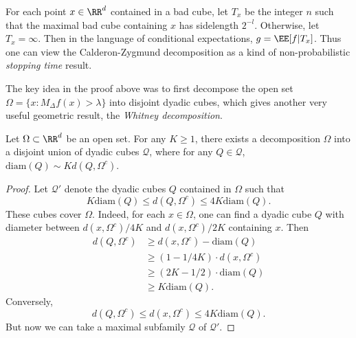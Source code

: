 \begin{remark}
    For each point $x \in \RR^d$ contained in a bad cube, let $T_x$ be the integer $n$ such that the maximal bad cube containing $x$ has sidelength $2^{-l}$. Otherwise, let $T_x = \infty$. Then in the language of conditional expectations, $g = \EE[f | T_x]$. Thus one can view the Calderon-Zygmund decomposition as a kind of non-probabilistic \emph{stopping time} result.
\end{remark}

The key idea in the proof above was to first decompose the open set $\Omega = \{ x : M_\Delta f(x) > \lambda \}$ into disjoint dyadic cubes, which gives another very useful geometric result, the \emph{Whitney decomposition}.

\begin{theorem}
    Let $\Omega \subset \RR^d$ be an open set. For any $K \geq 1$, there exists a decomposition $\Omega$ into a disjoint union of dyadic cubes $\mathcal{Q}$, where for any $Q \in \mathcal{Q}$, $\text{diam}(Q) \sim K d(Q, \Omega^c)$.
\end{theorem}
\begin{proof}
    Let $\mathcal{Q}'$ denote the dyadic cubes $Q$ contained in $\Omega$ such that
    \[ K \text{diam}(Q) \leq d(Q, \Omega^c ) \leq 4K \text{diam}(Q).  \]
    These cubes cover $\Omega$. Indeed, for each $x \in \Omega$, one can find a dyadic cube $Q$ with diameter between $d(x,\Omega^c)/4K$ and $d(x,\Omega^c)/2K$ containing $x$. Then
    \begin{align*}
        d(Q,\Omega^c) &\geq d(x,\Omega^c) - \text{diam}(Q)\\
        &\geq (1 - 1/4K) \cdot d(x,\Omega^c)\\
        &\geq (2K - 1/2) \cdot \text{diam}(Q)\\
        &\geq K \text{diam}(Q).
    \end{align*}
    Conversely,
    \[ d(Q,\Omega^c) \leq d(x,\Omega^c) \leq 4K \text{diam}(Q). \]
    But now we can take a maximal subfamily $\mathcal{Q}$ of $\mathcal{Q}'$.
\end{proof}

